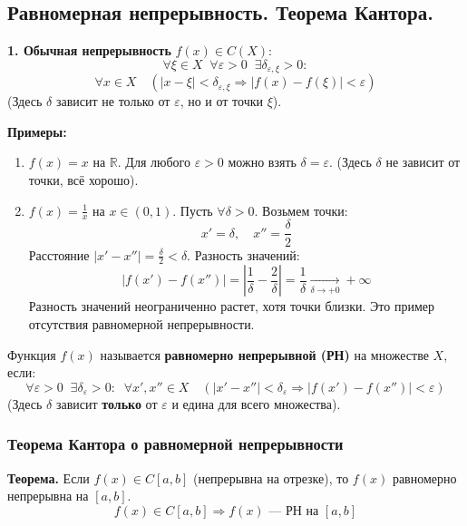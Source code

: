\subsection{Равномерная непрерывность. Теорема Кантора.}

\textbf{1. Обычная непрерывность} $f(x) \in C(X)$:
\[ \forall \xi \in X \;\; \forall \varepsilon > 0 \;\; \exists \delta_{\varepsilon, \xi} > 0: \]
\[ \forall x \in X \quad (|x - \xi| < \delta_{\varepsilon, \xi} \Rightarrow |f(x) - f(\xi)| < \varepsilon) \]
(Здесь $\delta$ зависит не только от $\varepsilon$, но и от точки $\xi$).

\textbf{Примеры:}
\begin{enumerate}
    \item $f(x) = x$ на $\mathbb{R}$.
    Для любого $\varepsilon > 0$ можно взять $\delta = \varepsilon$. (Здесь $\delta$ не зависит от точки, всё хорошо).
    
    \item $f(x) = \frac{1}{x}$ на $x \in (0, 1)$.
    Пусть $\forall \delta > 0$. Возьмем точки:
    \[ x' = \delta, \quad x'' = \frac{\delta}{2} \]
    Расстояние $|x' - x''| = \frac{\delta}{2} < \delta$.
    Разность значений:
    \[ |f(x') - f(x'')| = \left| \frac{1}{\delta} - \frac{2}{\delta} \right| = \frac{1}{\delta} \xrightarrow[\delta \to +0]{} +\infty \]
    Разность значений неограниченно растет, хотя точки близки. Это пример отсутствия равномерной непрерывности.
\end{enumerate}

\begin{tcolorbox}[title=Определение (Равномерная непрерывность)]
    Функция $f(x)$ называется \textbf{равномерно непрерывной (РН)} на множестве $X$, если:
    \[ \forall \varepsilon > 0 \;\; \exists \delta_\varepsilon > 0: \;\; \forall x', x'' \in X \quad (|x' - x''| < \delta_\varepsilon \Rightarrow |f(x') - f(x'')| < \varepsilon) \]
    (Здесь $\delta$ зависит \textbf{только} от $\varepsilon$ и едина для всего множества).
\end{tcolorbox}

\subsubsection*{Теорема Кантора о равномерной непрерывности}
\textbf{Теорема.} Если $f(x) \in C[a, b]$ (непрерывна на отрезке), то $f(x)$ равномерно непрерывна на $[a, b]$.
\[ f(x) \in C[a, b] \Rightarrow f(x) \text{ — РН на } [a, b] \]

